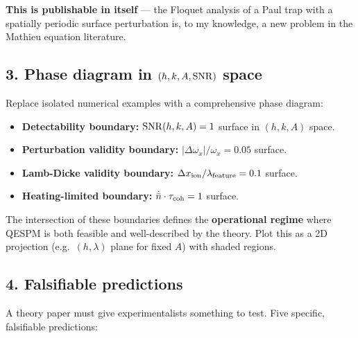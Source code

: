 \documentclass[11pt,a4paper]{article}
\begin{document}
\textbf{This is publishable in itself} --- the Floquet analysis of a Paul
trap with a spatially periodic surface perturbation is, to my knowledge,
a new problem in the Mathieu equation literature.

\subsection{3. Phase diagram in $(h, k, A, {\rm SNR})$ space}

Replace isolated numerical examples with a comprehensive phase diagram:

\begin{itemize}
    \item \textbf{Detectability boundary:} ${\rm SNR}(h,k,A) = 1$ surface
          in $(h,k,A)$ space.
    \item \textbf{Perturbation validity boundary:}
          $|\Delta\omega_x|/\omega_x = 0.05$ surface.
    \item \textbf{Lamb-Dicke validity boundary:}
          $\Delta x_{\rm ion}/\lambda_{\rm feature} = 0.1$ surface.
    \item \textbf{Heating-limited boundary:}
          $\dot{\bar{n}} \cdot \tau_{\rm coh} = 1$ surface.
\end{itemize}

The intersection of these boundaries defines the \textbf{operational regime}
where QESPM is both feasible and well-described by the theory.  Plot this
as a 2D projection (e.g.\ $(h, \lambda)$ plane for fixed $A$) with shaded
regions.

\subsection{4. Falsifiable predictions}

A theory paper must give experimentalists something to test.  Five specific,
falsifiable predictions:
\end{document}
